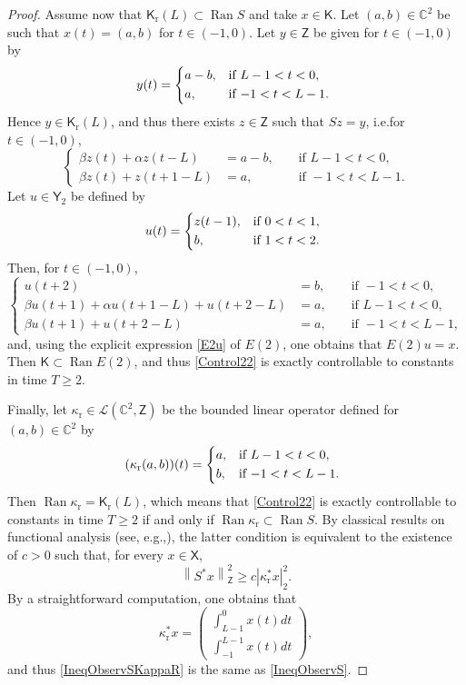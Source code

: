 \documentclass[10pt]{amsart}
\providecommand{\eg}{}
\renewcommand{\eg}{e.g.,\xspace}
\theoremstyle{plain}
\theoremstyle{definition}
\DeclareMathOperator{\range}{Ran}
\newcommand{\norm}[1]{\left\lVert #1\right\lVert}
\newcommand{\abs}[1]{\left\lvert #1\right \rvert}
\providecommand{\ie}{i.e.}\providecommand{\etc}{etc.}\providecommand{\resp}{resp.}\providecommand{\cf}{cf.}
\begin{document}
\begin{proof}
Assume now that $\mathsf K_{\mathrm r}(L) \subset \range S$ and take $x \in \mathsf K$. Let $(a, b) \in \mathbb C^2$ be such that $x(t) = (a, b)$ for $t \in (-1, 0)$. Let $y \in \mathsf Z$ be given for $t \in (-1, 0)$ by
\[
y(t) = \begin{dcases*}
a - b, & if $L - 1 < t < 0$, \\
a, & if $-1 < t < L - 1$.
\end{dcases*}
\]
Hence $y \in \mathsf K_{\mathrm r}(L)$, and thus there exists $z \in \mathsf Z$ such that $S z = y$, \ie for $t \in (-1, 0)$,
\[
\left\{
\begin{aligned}
\beta z(t) + \alpha z(t - L) & = a - b, & & \text{ if } L - 1 < t < 0, \\
\beta z(t) + z(t + 1 - L) & = a, & & \text{ if } -1 < t < L - 1.
\end{aligned}
\right.
\]
Let $u \in \mathsf Y_2$ be defined by
\[
u(t) =
\begin{dcases*}
z(t - 1), & if $0 < t < 1$, \\
b, & if $1 < t < 2$.
\end{dcases*}
\]
Then, for $t \in (-1, 0)$,
\[
\left\{
\begin{aligned}
u(t + 2) & = b, & & \text{ if } -1 < t < 0, \\
\beta u(t + 1) + \alpha u(t + 1 - L) + u(t + 2 - L) & = a, & & \text{ if } L - 1 < t < 0, \\
\beta u(t + 1) + u(t + 2 - L) & = a, & & \text{ if } -1 < t < L - 1,
\end{aligned}
\right.
\]
and, using the explicit expression \eqref{E2u} of $E(2)$, one obtains that $E(2) u = x$. Then $\mathsf K \subset \range E(2)$, and thus \eqref{Control22} is exactly controllable to constants in time $T \geq 2$.

Finally, let $\kappa_{\mathrm r} \in \mathcal L(\mathbb C^2, \mathsf Z)$ be the bounded linear operator defined for $(a, b) \in \mathbb C^2$ by
\[
(\kappa_{\mathrm r} (a, b)) (t) =
\begin{dcases*}
a, & if $L - 1 < t < 0$, \\
b, & if $-1 < t < L - 1$.
\end{dcases*}
\]
Then $\range \kappa_{\mathrm r} = \mathsf K_{\mathrm r}(L)$, which means that \eqref{Control22} is exactly controllable to constants in time $T \geq 2$ if and only if $\range \kappa_{\mathrm r} \subset \range S$. By classical results on functional analysis (see, \eg \cite[Lem.\,2.48]{Coron2007Control}), the latter condition is equivalent to the existence of $c > 0$ such that, for every $x \in \mathsf X$,
\begin{equation}
\label{IneqObservSKappaR}
\norm{S^\ast x}_{\mathsf Z}^2 \geq c \abs{\kappa_{\mathrm r}^\ast x}_2^2.
\end{equation}
By a straightforward computation, one obtains that
\[
\kappa_{\mathrm r}^\ast x =
\left(
\begin{aligned}
\textstyle\int_{L-1}^0 x(t) dt \\
\textstyle\int_{-1}^{L-1} x(t) dt
\end{aligned}
\right),
\]
and thus \eqref{IneqObservSKappaR} is the same as \eqref{IneqObservS}.
\end{proof}
\end{document}
